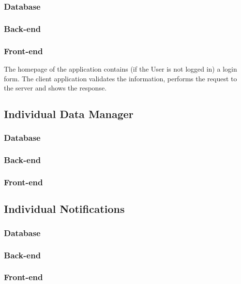 \subsubsection*{Database}


\subsubsection*{Back-end}


\subsubsection*{Front-end}
The homepage of the application contains (if the User is not logged in) a login form. The client application validates the information, performs the request to the server and shows the response.

\subsection{Individual Data Manager}

\subsubsection*{Database}


\subsubsection*{Back-end}


\subsubsection*{Front-end}

\subsection{Individual Notifications}

\subsubsection*{Database}


\subsubsection*{Back-end}


\subsubsection*{Front-end}

